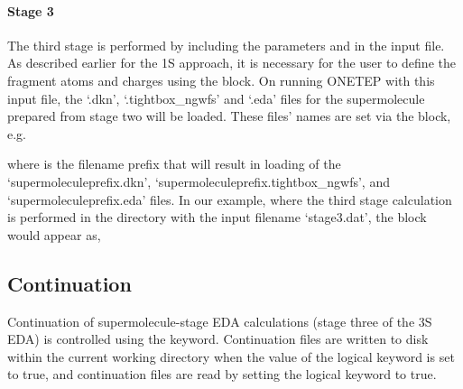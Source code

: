 \documentclass[letterpaper,10pt,english]{sphinxmanual}
\begin{document}
\paragraph{Stage 3}
\label{\detokenize{EDA:stage-3}}
The third stage is performed by including the parameters
 and  in the input file. As described
earlier for the 1S approach, it is necessary for the user to define the
fragment atoms and charges using the  block. On running
ONETEP with this input file, the ‘.dkn’, ‘.tightbox\_ngwfs’ and ‘.eda’
files for the supermolecule prepared from stage two will be loaded.
These files’ names are set via the  block, e.g.

%
\begin{sphinxVerbatim}[commandchars=\\\{\}]
 
 
\end{sphinxVerbatim}

where  is the filename prefix that will result in
loading of the ‘supermoleculeprefix.dkn’,
‘supermoleculeprefix.tightbox\_ngwfs’, and ‘supermoleculeprefix.eda’
files. In our example, where the third stage calculation is performed in
the directory  with the input filename ‘stage3.dat’, the
block would appear as,

%
\begin{sphinxVerbatim}[commandchars=\\\{\}]
 
 
\end{sphinxVerbatim}


\subsection{Continuation}
\label{\detokenize{EDA:continuation}}
Continuation of supermolecule-stage EDA calculations (stage three of the
3S EDA) is controlled using the  keyword.
Continuation files are written to disk within the current working
directory when the value of the  logical keyword is set to
true, and continuation files are read by setting the
 logical keyword to true.
\end{document}
